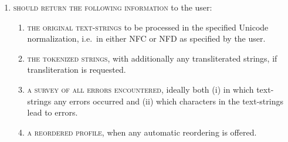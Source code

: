 \begin{enumerate}
\begin{enumerate}
        function universally in the same way across orthographies.\footnote{For example 
		compare the different first-letter capitalization practices of the digraphs 
		<ǋ> and <Ĳ> (single-character ligatures in the Unicode Standard) 
		in the Latin-based scripts of Southern-Slavic languages and 
		Dutch, respectively.} Ideally,
        users should prepare orthography profiles with all lowercase and
        uppercase variants explicitly mentioned, so by default no case matching
        should be performed. 
		\item \textsc{to treat the profile literally}, i.e.~to not interpret regular
        expression metacharacters. Matching graphemes literally often leads to
        significant speed increase, and ensures that users do not have to worry
        about escaping metacharacters. However, in our experience all actually
        interesting use-cases of orthography profiles include some contexts,
        which automatically prevents any literal interpretation.
    \end{enumerate}
	\item \textsc{should return the following information} to the user:
	\begin{enumerate}
		\def\labelenumii{C\arabic{enumii}.} \setcounter{enumii}{8} 
		\item \textsc{the original text-strings} to be processed in the specified
        Unicode normalization, i.e.~in either NFC or NFD as specified by the
        user. 
		\item \textsc{the tokenized strings}, with additionally any transliterated
        strings, if transliteration is requested. 
		\item \textsc{a survey of all errors encountered}, ideally both (i) in which
        text-strings any errors occurred and (ii) which characters in the
        text-strings lead to errors. 
		\item \textsc{a reordered profile}, when any automatic reordering is offered. 
	\end{enumerate}
\end{enumerate}

